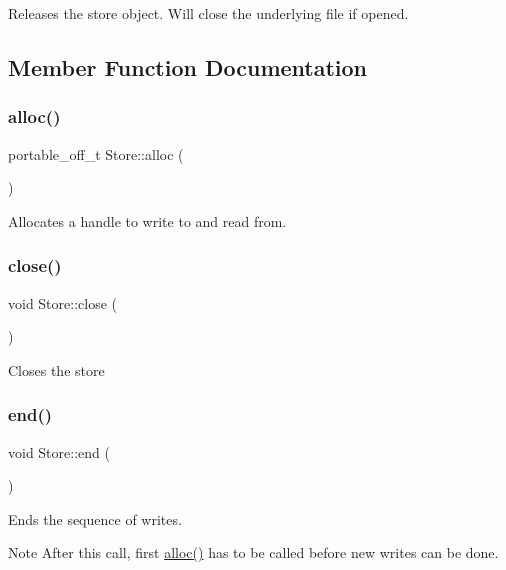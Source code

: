 Releases the store object. Will close the underlying file if opened. 

\subsection{Member Function Documentation}
\mbox{\label{class_store_ac1ce3fb86b3bc46125756b9ef782c095}} 
\subsubsection{\texorpdfstring{alloc()}{alloc()}}
{\footnotesize\ttfamily portable\+\_\+off\+\_\+t Store\+::alloc (\begin{DoxyParamCaption}{ }\end{DoxyParamCaption})}

Allocates a handle to write to and read from. \mbox{\label{class_store_a1a3dd916ae5c4c2e6ca4d13f418344a9}} 
\subsubsection{\texorpdfstring{close()}{close()}}
{\footnotesize\ttfamily void Store\+::close (\begin{DoxyParamCaption}{ }\end{DoxyParamCaption})}

Closes the store \mbox{\label{class_store_a616a1f53fa04d39d505a03b1f49ab7a6}} 
\subsubsection{\texorpdfstring{end()}{end()}}
{\footnotesize\ttfamily void Store\+::end (\begin{DoxyParamCaption}{ }\end{DoxyParamCaption})}

Ends the sequence of writes. \begin{DoxyNote}{Note}
After this call, first \mbox{\hyperlink{class_store_ac1ce3fb86b3bc46125756b9ef782c095}{alloc()}} has to be called before new writes can be done. 
\end{DoxyNote}
\mbox{\label{class_store_a9707050019d12be2db8ea1b38d535f03}} 
